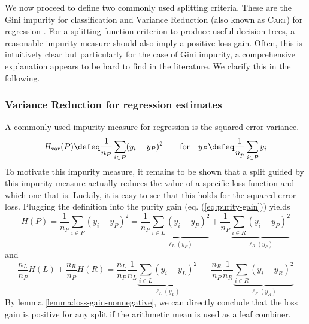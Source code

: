 \documentclass[../main.tex]{subfiles}
\begin{document}
We now proceed to define two commonly used splitting criteria. These are the Gini impurity for classification and Variance Reduction (also known as \textsc{Cart}) for regression \cite{tibshirani_ElementsStatisticalLearning_2017}.
For a splitting function criterion to produce useful decision trees, a reasonable impurity measure should also imply a positive loss gain. Often, this is intuitively clear but particularly for the case of Gini impurity, a comprehensive explanation appears to be hard to find in the literature. We clarify this in the following.

\subsubsection{Variance Reduction for regression estimates}

A commonly used impurity measure for regression is the squared-error variance. 
$$
H_{\text{var}}(P) \defeq \frac{1}{n_{P}} \sum_{i \in P} (y_{i} - y_{P})^2 \hspace{2em} \text{for} \hspace{1em} y_{P} \defeq \frac{1}{n_{p}}\sum_{i\in P}y_{i}
$$
To motivate this impurity measure, it remains to be shown that a split guided by this impurity measure actually reduces the value of a specific loss function and which one that is. Luckily, it is easy to see that this holds for the squared error loss. Plugging the definition into the purity gain (eq. (\ref{eq:purity-gain})) yields
$$
H(P) = \frac{1}{n_{P}} \sum_{i \in P} (y_{i} - y_{P})^2
= \frac{1}{n_{P}}  
\underbrace{
 \sum_{i \in L} (y_{i} - y_P)^2 
 }_{\ell_{L}(y_{P})}
 +
\frac{1}{n_{P}}
 \underbrace{
 \sum_{i \in R} (y_{i} - y_{P}) ^2
 }_{\ell_{R}(y_{P})}
$$
and
$$
\frac{n_{L}}{n_{P}} H(L) +
\frac{n_{R}}{n_{P}} H(R) = 
\frac{n_{L}}{n_{P}} \frac{1}{n_{L}} 
\underbrace{
\sum_{i \in L} (y_{i} - y_{L})^2
}_{\ell_{L}(y_{L})}
~ + ~ 
\frac{n_{R}}{n_{P}} \frac{1}{n_{R}}
\underbrace{
 \sum_{i \in R} (y_{i} - y_{R})^2
}_{\ell_{R}(y_{R})}
$$
By lemma \ref{lemma:loss-gain-nonnegative}, we can directly conclude that the loss gain is positive for any split if the arithmetic mean is used as a leaf combiner.
\end{document}
